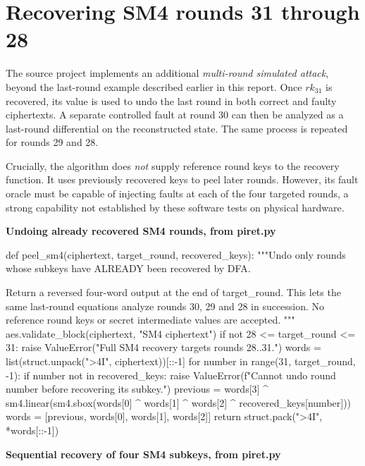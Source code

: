\section{Recovering SM4 rounds 31 through 28}
The source project implements an additional \emph{multi-round simulated attack}, beyond the last-round example described earlier in this report. Once $rk_{31}$ is recovered, its value is used to undo the last round in both correct and faulty ciphertexts. A separate controlled fault at round 30 can then be analyzed as a last-round differential on the reconstructed state. The same process is repeated for rounds 29 and 28.

Crucially, the algorithm does \emph{not} supply reference round keys to the recovery function. It uses previously recovered keys to peel later rounds. However, its fault oracle must be capable of injecting faults at each of the four targeted rounds, a strong capability not established by these software tests on physical hardware.
\par\smallskip\noindent\textbf{Undoing already recovered SM4 rounds, from piret.py}\par
\begin{lightcode}
def peel_sm4(ciphertext, target_round, recovered_keys):
    """Undo only rounds whose subkeys have ALREADY been recovered by DFA.

    Return a reversed four-word output at the end of target_round. This lets
    the same last-round equations analyze rounds 30, 29 and 28 in succession.
    No reference round keys or secret intermediate values are accepted.
    """
    aes.validate_block(ciphertext, "SM4 ciphertext")
    if not 28 <= target_round <= 31:
        raise ValueError("Full SM4 recovery targets rounds 28..31.")
    words = list(struct.unpack(">4I", ciphertext))[::-1]
    for number in range(31, target_round, -1):
        if number not in recovered_keys:
            raise ValueError(f"Cannot undo round {number} before recovering its subkey.")
        previous = words[3] ^ sm4.linear(sm4.sbox(words[0] ^ words[1] ^ words[2] ^ recovered_keys[number]))
        words = [previous, words[0], words[1], words[2]]
    return struct.pack(">4I", *words[::-1])
\end{lightcode}
\par\smallskip\noindent\textbf{Sequential recovery of four SM4 subkeys, from piret.py}\par
